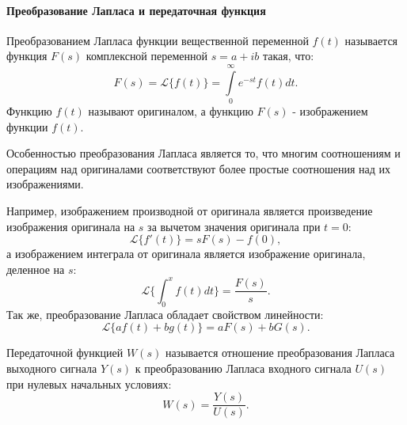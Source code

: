 \paragraph*{Преобразование Лапласа и передаточная функция\\}
\hspace*{\parindent} Преобразованием Лапласа функции вещественной переменной $f(t)$ называется функция $F(s)$ комплексной переменной $s=a+ib$ такая, что:
\begin{equation}
	F(s) = \mathcal{L}\{f(t)\} = \int\limits_{0}^{\infty} e^{-st}f(t)dt.
\end{equation}
Функцию $f(t)$ называют оригиналом, а функцию $F(s)$ - изображением функции $f(t)$. 

Особенностью преобразования Лапласа является то, что многим соотношениям и операциям над оригиналами соответствуют более простые соотношения над их изображениями. 

Например, изображением производной от оригинала является произведение изображения оригинала на $s$ за вычетом значения оригинала при $t=0$:
\begin{equation}
	\mathcal{L}\{f'(t)\} = sF(s) - f(0),
\end{equation}
а изображением интеграла от оригинала является изображение оригинала, деленное на $s$:
\begin{equation}
	\mathcal{L}\{\int_{0}^{x} f(t)dt\}=\frac{F(s)}{s}.
\end{equation}
Так же, преобразование Лапласа обладает свойством линейности:
\begin{equation}
	\mathcal{L}\{af(t)+bg(t)\}=aF(s)+bG(s).
\end{equation}

Передаточной функцией $W(s)$ называется отношение преобразования Лапласа выходного сигнала $Y(s)$ к преобразованию Лапласа входного сигнала $U(s)$ при нулевых начальных условиях:
\begin{equation}
	W(s) = \frac{Y(s)}{U(s)}.
\end{equation}

